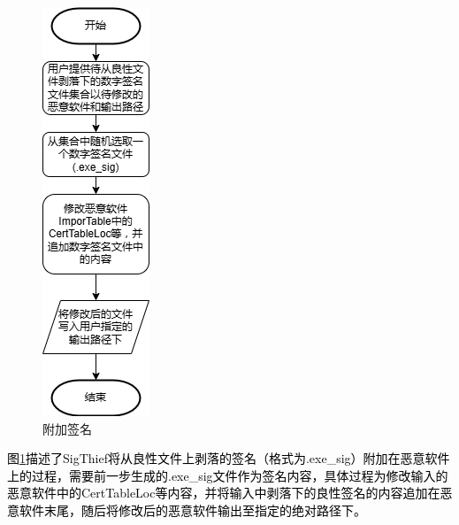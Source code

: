 \begin{figure}
  \centering
  \includegraphics[]{images/append_signature.png}
  \caption{附加签名}\label{fig:append_signature}
\end{figure}
\textcolor{black}{图\ref{fig:append_signature}描述了SigThief将从良性文件上剥落的签名（格式为.exe\_sig）附加在恶意软件上的过程，需要前一步生成的.exe\_sig文件作为签名内容，具体过程为修改输入的恶意软件中的CertTableLoc等内容，并将输入中剥落下的良性签名的内容追加在恶意软件末尾，随后将修改后的恶意软件输出至指定的绝对路径下。}

